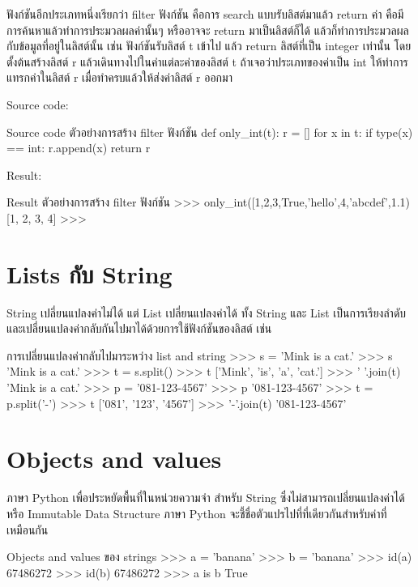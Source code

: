 ฟังก์ชันอีกประเภทหนึ่งเรียกว่า filter ฟังก์ชัน คือการ search แบบรับลิสต์มาแล้ว return ค่า คือมีการค้นหาแล้วทำการประมวลผลค่านั้นๆ หรืออาจจะ return มาเป็นลิสต์ก็ได้ แล้วก็ทำการประมวลผลกับข้อมูลที่อยู่ในลิสต์นั้น เช่น ฟังก์ชันรับลิสต์ t เข้าไป แล้ว return ลิสต์ที่เป็น integer เท่านั้น โดยตั้งต้นสร้างลิสต์ r แล้วเดินทางไปในค่าแต่ละค่าของลิสต์ t ถ้าเจอว่าประเภทของค่าเป็น int ให้ทำการแทรกค่าในลิสต์ r เมื่อทำครบแล้วให้ส่งค่าลิสต์ r ออกมา

Source code:
\begin{codelist}{Source code ตัวอย่างการสร้าง filter ฟังก์ชัน}{}
def only_int(t):
    r = []
    for x in t:
        if type(x) == int: r.append(x)
    return r
\end{codelist}

Result:
\begin{codelist}{Result ตัวอย่างการสร้าง filter ฟังก์ชัน}{}
>>> only_int([1,2,3,True,'hello',4,'abcdef',1.1)
[1, 2, 3, 4]
>>>
\end{codelist}

\section{Lists กับ String}

String เปลี่ยนแปลงค่าไม่ได้ แต่ List เปลี่ยนแปลงค่าได้ ทั้ง String และ List เป็นการเรียงลำดับและเปลี่ยนแปลงค่ากลับกันไปมาได้ด้วยการใช้ฟังก์ชันของลิสต์ เช่น 

\begin{codelist}{การเปลี่ยนแปลงค่ากลับไปมาระหว่าง list and string}{}
>>> s = 'Mink is a cat.'
>>> s
'Mink is a cat.'
>>> t = s.split()
>>> t
['Mink', 'is', 'a', 'cat.']
>>> ' '.join(t)
'Mink is a cat.'
>>> p = '081-123-4567'
>>> p
'081-123-4567'
>>> t = p.split('-')
>>> t
['081', '123', '4567']
>>> '-'.join(t)
'081-123-4567'
\end{codelist}


\section{Objects and values}

ภาษา Python เพื่อประหยัดพื้นที่ในหน่วยความจำ สำหรับ String ซึ่งไม่สามารถเปลี่ยนแปลงค่าได้ หรือ Immutable Data Structure ภาษา Python จะชี้ชื่อตัวแปรไปที่ที่เดียวกันสำหรับค่าที่เหมือนกัน 

\begin{codelist}{Objects and values ของ strings}{}
>>> a = 'banana'
>>> b = 'banana'
>>> id(a)
67486272
>>> id(b)
67486272
>>> a is b
True
\end{codelist}


